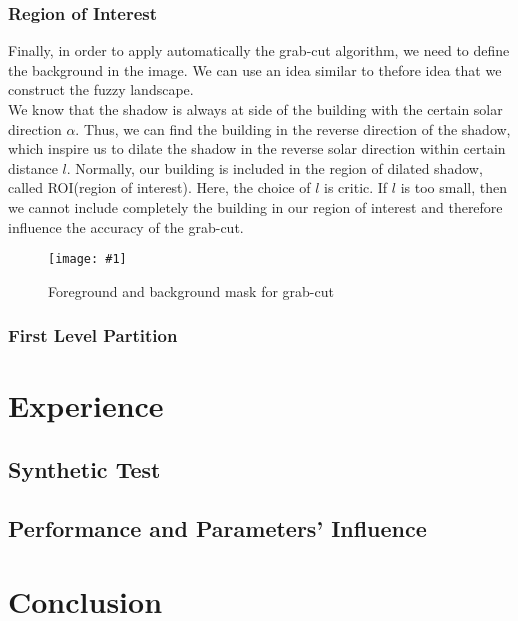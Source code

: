 \documentclass[runningheads]{llncs}
\newcommand{\insertF}[4]{
  \begin{figure}[h!]
    \centering
    \begin{minipage}{#3\linewidth}
    \texttt{[image: \#1]}
    \end{minipage}  
      \caption{#2}
      \label{#4}
  \end{figure}  
}
\begin{document}
\subsubsection{Region of Interest}
Finally, in order to apply automatically the grab-cut algorithm, we need to define the background in the image. We can use an idea similar to thefore idea that we construct the fuzzy landscape.\\
We know that the shadow is always at side of the building with the certain solar direction $\alpha$. Thus, we can find the building in the reverse direction of the shadow, which inspire us to dilate the shadow in the reverse solar direction within certain distance $l$. Normally, our building is included in the region of dilated shadow, called ROI(region of interest). Here, the choice of $l$ is critic. If $l$ is too small, then we cannot include completely the building in our region of interest and therefore influence the accuracy of the grab-cut. 
\insertF{fore-back}{Foreground and background mask for grab-cut}{0.8}{6}
\FloatBarrier
\subsubsection{First Level Partition}


\section{Experience}
\subsection{Synthetic Test}
\subsection{Performance and Parameters' Influence}

\section{Conclusion}
\newpage



\end{document}
